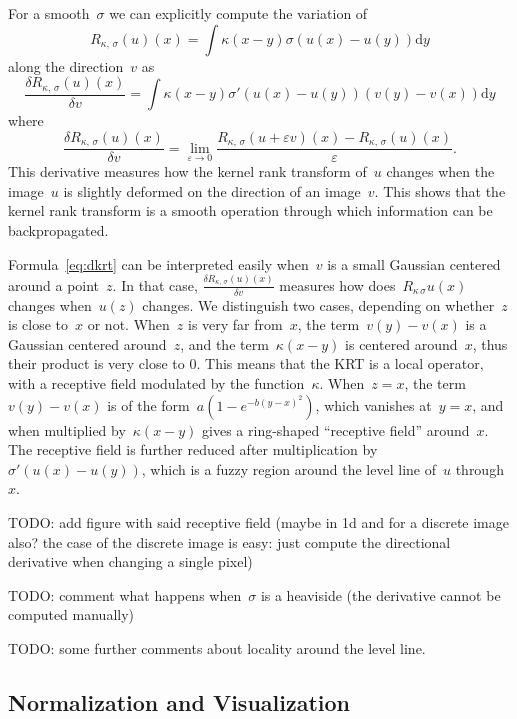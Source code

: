 \documentclass[12pt]{article}                  %
\def\parens#1{\left(#1\right)}
\begin{document}
For a smooth~$\sigma$ we can explicitly compute the variation of
\begin{equation}
	R_{\kappa,\,\sigma}(u)(x) = \int\kappa(x-y)\sigma\parens{u(x)-u(y)}\mathrm{d}y
\end{equation}
along the direction~$v$ as
\begin{equation}\label{eq:dkrt}
	\frac{\delta R_{\kappa,\,\sigma}(u)(x)}{\delta v}
	= \int\kappa(x-y)\sigma'\parens{u(x)-u(y)}\parens{v(y)-v(x)}\mathrm{d}y
\end{equation}
where
\begin{equation}
	\frac{\delta R_{\kappa,\,\sigma}(u)(x)}{\delta v}
	=
	\lim_{\varepsilon\to0}
	\frac{R_{\kappa,\,\sigma}(u+\varepsilon v)(x)
	     -R_{\kappa,\,\sigma}(u)(x)}{\varepsilon}.
\end{equation}
This derivative measures how the kernel rank transform of~$u$ changes
when the image~$u$ is slightly deformed on the direction of an image~$v$.
This shows that the kernel rank transform is a smooth operation through
which information can be backpropagated.

Formula~\ref{eq:dkrt} can be interpreted easily when~$v$ is a small Gaussian
centered around a point~$z$.  In that case, $\frac{\delta
R_{\kappa,\,\sigma}(u)(x)}{\delta v}$ measures how
does~$R_{\kappa\,\sigma}u(x)$ changes when~$u(z)$ changes.
We distinguish two cases, depending on whether~$z$ is close to~$x$ or not.
When~$z$ is very far from~$x$, the term~$v(y)-v(x)$ is a Gaussian centered
around~$z$, and the term~$\kappa(x-y)$ is centered around~$x$, thus their
product is very close to 0.  This means that the KRT is a local operator,
with a receptive field modulated by the function~$\kappa$.  When~$z=x$, the
term~$v(y)-v(x)$ is of the form~$a(1-e^{-b(y-x)^2})$, which vanishes
at~$y=x$, and when multiplied by~$\kappa(x-y)$ gives a ring-shaped ``receptive
field'' around~$x$.  The receptive field is further reduced after
multiplication by~$\sigma'\parens{u(x)-u(y)}$, which is a fuzzy region
around the level line of~$u$ through~$x$.

TODO: add figure with said receptive field (maybe in 1d and for a discrete
image also? the case of the discrete image is easy: just compute the
directional derivative when changing a single pixel)

TODO: comment what happens when~$\sigma$ is a heaviside (the derivative
cannot be computed manually)

TODO: some further comments about locality around the level line.


\subsection{Normalization and Visualization}
\end{document}
